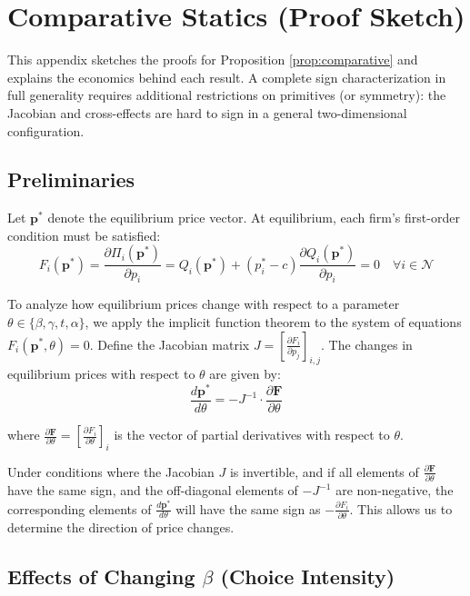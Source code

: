 \documentclass{article}
\begin{document}
\section{Comparative Statics (Proof Sketch)}
\label{app:comparative_statics}

This appendix sketches the proofs for Proposition \ref{prop:comparative} and explains the economics behind each result. A complete sign characterization in full generality requires additional restrictions on primitives (or symmetry): the Jacobian and cross-effects are hard to sign in a general two-dimensional configuration.

\subsection{Preliminaries}

Let $\mathbf{p}^*$ denote the equilibrium price vector. At equilibrium, each firm's first-order condition must be satisfied:
\begin{equation}
  F_i(\mathbf{p}^*) = \frac{\partial \Pi_i(\mathbf{p}^*)}{\partial p_i} = Q_i(\mathbf{p}^*) + (p_i^* - c)\frac{\partial Q_i(\mathbf{p}^*)}{\partial p_i} = 0 \quad \forall i \in \mathcal{N}
\end{equation}

To analyze how equilibrium prices change with respect to a parameter $\theta \in \{\beta, \gamma, t, \alpha\}$, we apply the implicit function theorem to the system of equations $F_i(\mathbf{p}^*,\theta) = 0$. Define the Jacobian matrix $J = [\frac{\partial F_i}{\partial p_j}]_{i,j}$. The changes in equilibrium prices with respect to $\theta$ are given by:
\begin{equation}
  \frac{d\mathbf{p}^*}{d\theta} = -J^{-1}\cdot\frac{\partial \mathbf{F}}{\partial \theta}
\end{equation}

where $\frac{\partial \mathbf{F}}{\partial \theta} = [\frac{\partial F_i}{\partial \theta}]_i$ is the vector of partial derivatives with respect to $\theta$.

Under conditions where the Jacobian $J$ is invertible, and if all elements of $\frac{\partial \mathbf{F}}{\partial \theta}$ have the same sign, and the off-diagonal elements of $-J^{-1}$ are non-negative, the corresponding elements of $\frac{d\mathbf{p}^*}{d\theta}$ will have the same sign as $-\frac{\partial F_i}{\partial \theta}$. This allows us to determine the direction of price changes.

\subsection{Effects of Changing $\beta$ (Choice Intensity)}
\end{document}
